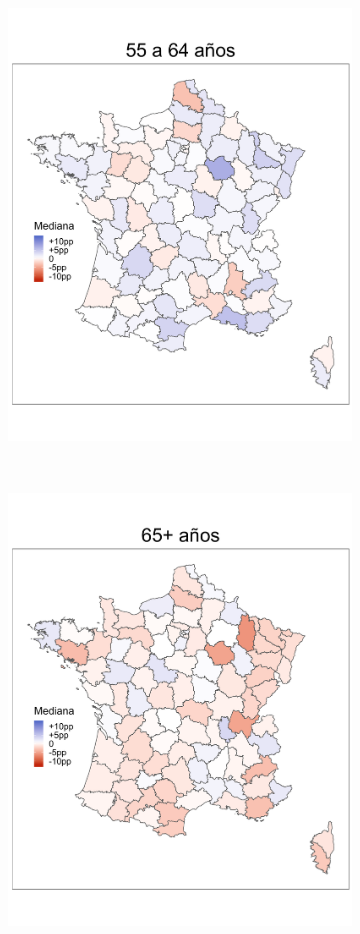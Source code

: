 \begin{figure}
\begin{subfigure}{0.3\textwidth}
	\includegraphics[width = \textwidth]{Figs/Efectos/Mapa_Efectos_Ed5_Modelo_H}
	\end{subfigure}
	~
	\begin{subfigure}{0.3\textwidth}
	\includegraphics[width = \textwidth]{Figs/Efectos/Mapa_Efectos_Ed6_Modelo_H}

\end{subfigure}
\end{figure}
